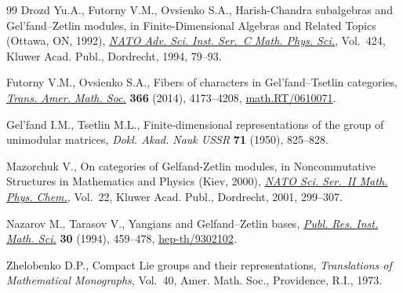 \documentclass[11pt]{article}
\numberwithin{equation}{section}
\begin{document}
\begin{thebibliography}{99}
Drozd Yu.A., Futorny V.M., Ovsienko S.A., Harish-{C}handra subalgebras and
  {G}el'fand--{Z}etlin mo\-du\-les, in Finite-Dimensional Algebras and Related
  Topics ({O}ttawa, {ON}, 1992), \href{http://dx.doi.org/10.1007/978-94-017-1556-0_5}{\textit{NATO Adv. Sci. Inst. Ser.~C Math.
  Phys. Sci.}}, Vol.~424, Kluwer Acad. Publ., Dordrecht, 1994, 79--93.

Futorny V.M., Ovsienko S.A., Fibers of characters in {G}el'fand--{T}setlin
  categories, \href{http://dx.doi.org/10.1090/S0002-9947-2014-05938-2}{\textit{Trans. Amer. Math. Soc.}} \textbf{366} (2014), 4173--4208,
  \href{http://arxiv.org/abs/math.RT/0610071}{math.RT/0610071}.

Gel'fand I.M., Tsetlin M.L., Finite-dimensional representations of the group of
  unimodular matrices, \textit{Dokl. Akad. Nauk USSR} \textbf{71} (1950),
  825--828.

Mazorchuk V., On categories of {G}elfand-{Z}etlin modules, in Noncommutative
  Structures in Mathematics and Physics ({K}iev, 2000), \href{http://dx.doi.org/10.1007/978-94-010-0836-5_24}{\textit{NATO Sci.
  Ser.~II Math. Phys. Chem.}}, Vol.~22, Kluwer Acad. Publ., Dordrecht, 2001,
  299--307.

Nazarov M., Tarasov V., Yangians and {G}elfand--{Z}etlin bases, \href{http://dx.doi.org/10.2977/prims/1195165907}{\textit{Publ.
  Res. Inst. Math. Sci.}} \textbf{30} (1994), 459--478, \href{http://arxiv.org/abs/hep-th/9302102}{hep-th/9302102}.

Zhelobenko D.P., Compact Lie groups and their representations,
  \textit{Translations of Mathematical Monographs}, Vol.~40, Amer. Math. Soc.,
  Providence, R.I., 1973.

\end{thebibliography}
\end{document}
